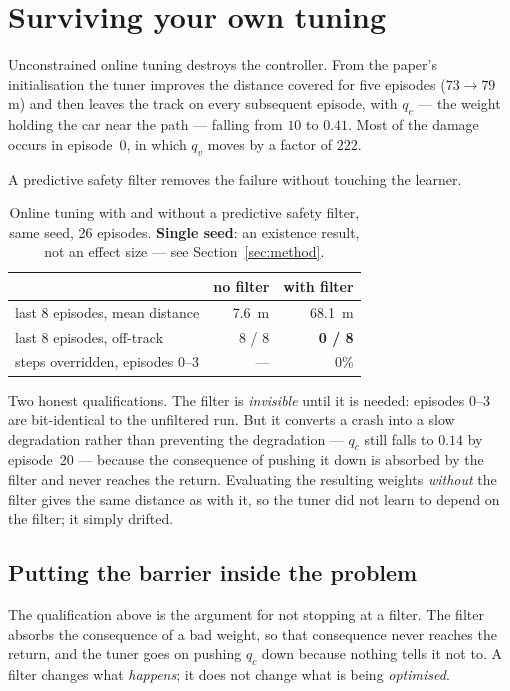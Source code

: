 \documentclass[letterpaper, 10 pt, conference]{ieeeconf}
\begin{document}
\section{Surviving your own tuning}\label{sec:safety}

Unconstrained online tuning destroys the controller. From the paper's
initialisation the tuner improves the distance covered for five episodes
($73 \to 79$\,m) and then leaves the track on every subsequent episode, with
$q_c$ --- the weight holding the car near the path --- falling from $10$ to
$0.41$. Most of the damage occurs in episode~0, in which $q_v$ moves by a factor
of $222$.

A predictive safety filter removes the failure without touching the learner.

\begin{table}[t]
  \centering
  \caption{Online tuning with and without a predictive safety filter, same seed,
  26 episodes. \textbf{Single seed}: an existence result, not an effect size ---
  see Section~\ref{sec:method}.}
  \label{tab:safety}
  \begin{tabular}{lrr}
    \toprule
     & no filter & with filter \\
    \midrule
    last 8 episodes, mean distance & \SI{7.6}{\meter} & \SI{68.1}{\meter} \\
    last 8 episodes, off-track     & 8 / 8 & \textbf{0 / 8} \\
    steps overridden, episodes 0--3 & --- & $0\%$ \\
    \bottomrule
  \end{tabular}
\end{table}

Two honest qualifications. The filter is \emph{invisible} until it is needed:
episodes 0--3 are bit-identical to the unfiltered run. But it converts a crash
into a slow degradation rather than preventing the degradation --- $q_c$ still
falls to $0.14$ by episode~20 --- because the consequence of pushing it down is
absorbed by the filter and never reaches the return. Evaluating the resulting
weights \emph{without} the filter gives the same distance as with it, so the
tuner did not learn to depend on the filter; it simply drifted.

\subsection{Putting the barrier inside the problem}\label{sec:cbf-ocp}
The qualification above is the argument for not stopping at a filter. The
filter absorbs the consequence of a bad weight, so that consequence never
reaches the return, and the tuner goes on pushing $q_c$ down because nothing
tells it not to. A filter changes what \emph{happens}; it does not change what
is being \emph{optimised}.
\end{document}
